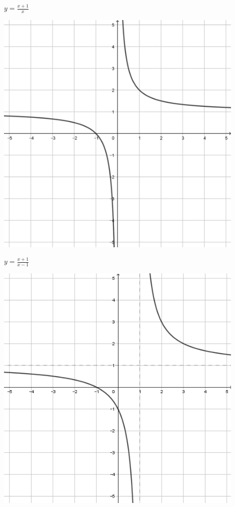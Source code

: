 \documentclass[a4paper]{oblivoir}
\begin{document}
\clearpage
\begin{minipage}{0.45\textwidth}\centering
\(y=\frac{x+1}{x}\)
\par\bigskip\includegraphics[width=0.9\textwidth]{img/4_rational_14}
\end{minipage}
\begin{minipage}{0.45\textwidth}\centering
\(y=\frac{x+1}{x-1}\)
\par\bigskip\includegraphics[width=0.9\textwidth]{img/4_rational_15}
\end{minipage}\bigskip\bigskip\par
\end{document}
